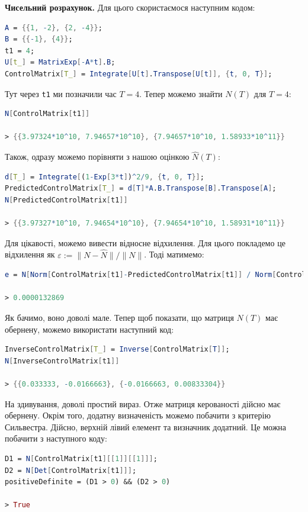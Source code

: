 \documentclass{hw_template}
\begin{document}
\textbf{Чисельний розрахунок.} Для цього скористаємося наступним кодом:
\begin{lstlisting}[language=Mathematica]
A = {{1, -2}, {2, -4}};
B = {{-1}, {4}};
t1 = 4;
U[t_] = MatrixExp[-A*t].B;
ControlMatrix[T_] = Integrate[U[t].Transpose[U[t]], {t, 0, T}];
\end{lstlisting}

Тут через \texttt{t1} ми позначили час $T=4$. Тепер можемо знайти $N(T)$ для $T=4$:

\begin{lstlisting}[language=Mathematica]
N[ControlMatrix[t1]]

> {{3.97324*10^10, 7.94657*10^10}, {7.94657*10^10, 1.58933*10^11}}
\end{lstlisting}

Також, одразу можемо порівняти з нашою оцінкою $\hat{N}(T)$:
\begin{lstlisting}[language=Mathematica]
d[T_] = Integrate[(1-Exp[3*t])^2/9, {t, 0, T}];
PredictedControlMatrix[T_] = d[T]*A.B.Transpose[B].Transpose[A];
N[PredictedControlMatrix[t1]]

> {{3.97327*10^10, 7.94654*10^10}, {7.94654*10^10, 1.58931*10^11}}
\end{lstlisting}

Для цікавості, можемо вивести відносне відхилення. Для цього покладемо це відхилення як $\varepsilon := \|N - \hat{N}\| \big/ \|N\|$. Тоді матимемо:
\begin{lstlisting}[language=Mathematica]
e = N[Norm[ControlMatrix[t1]-PredictedControlMatrix[t1]] / Norm[ControlMatrix[t1]]]

> 0.0000132869
\end{lstlisting}

Як бачимо, воно доволі мале. Тепер щоб показати, що матриця $N(T)$ має обернену, можемо використати наступний код:
\begin{lstlisting}[language=Mathematica]
InverseControlMatrix[T_] = Inverse[ControlMatrix[T]];
N[InverseControlMatrix[t1]]

> {{0.033333, -0.0166663}, {-0.0166663, 0.00833304}}
\end{lstlisting}

На здивування, доволі простий вираз. Отже матриця керованості дійсно має обернену. Окрім того, додатну визначеність можемо побачити з критерію Сильвестра. Дійсно, верхній лівий елемент та визначник додатний. Це можна побачити з наступного коду:
\begin{lstlisting}[language=Mathematica]
D1 = N[ControlMatrix[t1][[1]][[1]]];
D2 = N[Det[ControlMatrix[t1]]];
positiveDefinite = (D1 > 0) && (D2 > 0)

> True
\end{lstlisting}
\end{document}
